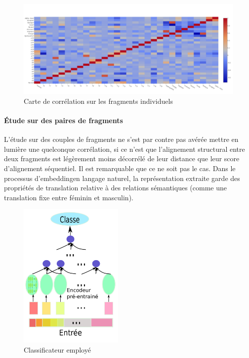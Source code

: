\documentclass[a4paper, 11pt, onecolumn]{article}
\begin{document}
\begin{figure}
  \centering
  \includegraphics[scale=1.7]{SingleOneRecHeatf}
  \caption{Carte de corrélation sur les fragments individuels}
\end{figure}

\paragraph{Étude sur des paires de fragments}

L'étude sur des couples de fragments ne s'est par contre pas avérée mettre en lumière
une quelconque corrélation, si ce n'est que l'alignement structural entre deux
fragments est légèrement moins décorrélé de leur distance que leur score d'alignement
séquentiel. Il est remarquable que ce ne soit pas le cas. Dans le processus \og
d'embedding\fg en langage naturel, la représentation extraite garde des
propriétés de translation relative à des relations sémantiques (comme une
translation fixe entre féminin et masculin). 

\begin{figure}
  \includegraphics[width=0.45\textwidth]{Classd}
  \caption{Classificateur employé}
\end{figure}
\end{document}
